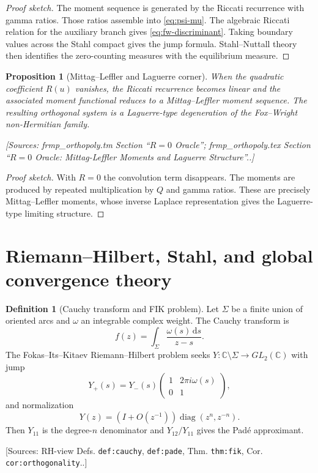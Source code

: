 \documentclass[11pt]{article}
\newtheorem{proposition}[theorem]{Proposition}
\theoremstyle{definition}
\newtheorem{definition}[theorem]{Definition}
\newcommand{\C}{\mathbb{C}}
\newcommand{\dd}{\,\mathrm{d}}
\newcommand{\diag}{\operatorname{diag}}
\newcommand{\Source}[1]{\par\smallskip\noindent\textup{[Sources: #1.]}}
\begin{document}
\begin{proof}[Proof sketch]
The moment sequence is generated by the Riccati recurrence with gamma ratios.
Those ratios assemble into \eqref{eq:psi-mu}.
The algebraic Riccati relation for the auxiliary branch gives \eqref{eq:fw-discriminant}.
Taking boundary values across the Stahl compact gives the jump formula.
Stahl--Nuttall theory then identifies the zero-counting measures with the equilibrium measure.
\end{proof}

\begin{proposition}[Mittag--Leffler and Laguerre corner]\label{prop:ml-laguerre}
When the quadratic coefficient $R(u)$ vanishes,
the Riccati recurrence becomes linear and the associated moment functional reduces to a Mittag--Leffler moment sequence.
The resulting orthogonal system is a Laguerre-type degeneration of the Fox--Wright non-Hermitian family.
\Source{frmp\_orthopoly.tm Section ``$R=0$ Oracle''; frmp\_orthopoly.tex Section ``$R=0$ Oracle: Mittag-Leffler Moments and Laguerre Structure''.}
\end{proposition}

\begin{proof}[Proof sketch]
With $R=0$ the convolution term disappears.
The moments are produced by repeated multiplication by $Q$ and gamma ratios.
These are precisely Mittag--Leffler moments,
whose inverse Laplace representation gives the Laguerre-type limiting structure.
\end{proof}

\section{Riemann--Hilbert, Stahl, and global convergence theory}

\begin{definition}[Cauchy transform and FIK problem]\label{def:fik}
Let $\Sigma$ be a finite union of oriented arcs and $\omega$ an integrable complex weight.
The Cauchy transform is
\begin{equation}\label{eq:cauchy-transform}
        f(z)=\int_{\Sigma}\frac{\omega(s)\dd s}{z-s}.
\end{equation}
The Fokas--Its--Kitaev Riemann--Hilbert problem seeks $Y:\C\setminus\Sigma\to GL_2(\C)$ with jump
\begin{equation}\label{eq:fik-jump}
        Y_+(s)=Y_-(s)
        \begin{pmatrix}1&2\pi i\omega(s)\\0&1\end{pmatrix},
\end{equation}
and normalization
\begin{equation}\label{eq:fik-normal}
        Y(z)=\left(I+O(z^{-1})\right)\diag(z^n,z^{-n}).
\end{equation}
Then $Y_{11}$ is the degree-$n$ denominator and $Y_{12}/Y_{11}$ gives the Padé approximant.
\Source{RH-view Defs. \texttt{def:cauchy}, \texttt{def:pade}, Thm. \texttt{thm:fik}, Cor. \texttt{cor:orthogonality}.}
\end{definition}
\end{document}
